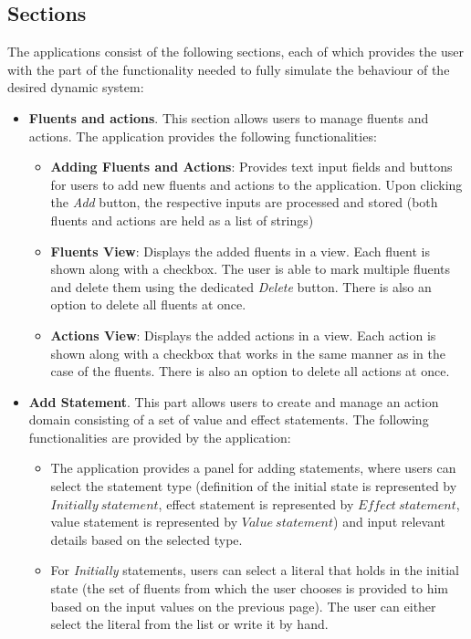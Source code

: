 \documentclass[a4paper]{article}
\begin{document}
\subsection{Sections}
%
The applications consist of the following sections, each of which provides the user with the part of the functionality needed to fully simulate the behaviour of the desired dynamic system:
\begin{itemize}
    \item \textbf{Fluents and actions}. This section allows users to manage fluents and actions. The application provides the following functionalities: 
    \begin{itemize}
        \item \textbf{Adding Fluents and Actions}: Provides text input fields and buttons for users to add new fluents and actions to the application. Upon clicking the \textit{Add} button, the respective inputs are processed and stored (both fluents and actions are held as a list of strings)
        \item \textbf{Fluents View}: Displays the added fluents in a view. Each fluent is shown along with a checkbox. The user is able to mark multiple fluents and delete them using the dedicated \textit{Delete} button. There is also an option to delete all fluents at once.
        \item \textbf{Actions View}: Displays the added actions in a view. Each action is shown along with a checkbox that works in the same manner as in the case of the fluents. There is also an option to delete all actions at once.
   \end{itemize}
    \item \textbf{Add Statement}. This part allows users to create and manage an action domain consisting of a set of value and effect statements. The following functionalities are provided by the application: 
    \begin{itemize}
        \item The application provides a panel for adding statements, where users can select the statement type (definition of the initial state is represented by $Initially~statement$, effect statement is represented by $Effect~statement$, value statement is represented by $Value~statement$) and input relevant details based on the selected type.
        \item For \textit{Initially} statements, users can select a literal that holds in the initial state (the set of fluents from which the user chooses is provided to him based on the input values on the previous page). The user can either select the literal from the list or write it by hand.

\end{itemize}
\end{itemize}
\end{document}
